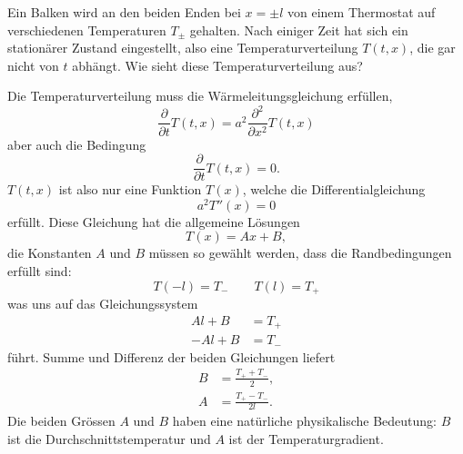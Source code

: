 Ein Balken wird an den beiden Enden bei $x=\pm l$ von einem Thermostat
auf verschiedenen Temperaturen $T_\pm$ gehalten. Nach einiger Zeit
hat sich ein stationärer Zustand eingestellt, also eine Temperaturverteilung
$T(t,x)$, die gar nicht von $t$ abhängt. Wie sieht diese Temperaturverteilung
aus?

\begin{loesung}
Die Temperaturverteilung muss die Wärmeleitungsgleichung erfüllen,
\[
\frac{\partial}{\partial t}T(t,x)=
a^2\frac{\partial^2}{\partial x^2}T(t,x)
\]
aber auch die Bedingung
\[
\frac{\partial}{\partial t}T(t,x)=0.
\]
$T(t,x)$ ist also nur eine Funktion $T(x)$, welche die Differentialgleichung
\[
a^2T''(x)=0
\]
erfüllt. Diese Gleichung hat die allgemeine Lösungen
\[
T(x)=Ax+B,
\]
die Konstanten $A$ und $B$ müssen so gewählt werden, dass
die Randbedingungen erfüllt sind:
\[
T(-l)=T_-\qquad T(l)=T_+
\]
was uns auf das Gleichungssystem
\begin{align*}
Al+B&=T_+\\
-Al+B&=T_-
\end{align*}
führt.
Summe und Differenz der beiden Gleichungen liefert
\begin{align*}
B&=\frac{T_++T_-}{2},
\\
A&=\frac{T_+-T_-}{2l}.
\end{align*}
Die beiden Grössen $A$ und $B$ haben eine natürliche physikalische
Bedeutung: $B$ ist die Durchschnitts\-temperatur und $A$ ist der
Temperaturgradient.
\end{loesung}
